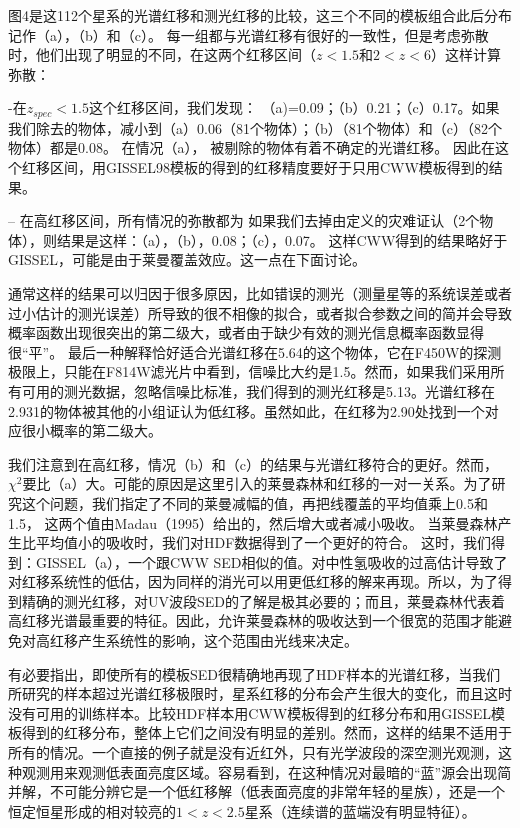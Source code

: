 \documentclass[8pt,a4paper,openany,twoside]{book}
\begin{document}
 
 
 
图4是这112个星系的光谱红移和测光红移的比较，这三个不同的模板组合此后分布记作（a），（b）和（c）。
每一组都与光谱红移有很好的一致性，但是考虑弥散时，他们出现了明显的不同，在这两个红移区间（$z<1.5和2<z<6$）这样计算弥散：
 
-在$z_{spec}< 1.5$这个红移区间，我们发现：
（a)=0.09；（b）0.21；（c）0.17。如果我们除去的物体，减小到（a）0.06（81个物体）；（b）（81个物体）和（c）（82个物体）都是0.08。
在情况（a）， 被剔除的物体有着不确定的光谱红移。
因此在这个红移区间，用GISSEL98模板的得到的红移精度要好于只用CWW模板得到的结果。
 
-- 在高红移区间，所有情况的弥散都为
如果我们去掉由定义的灾难证认（2个物体），则结果是这样：（a），（b），0.08；（c），0.07。
这样CWW得到的结果略好于GISSEL，可能是由于莱曼覆盖效应。这一点在下面讨论。
 
通常这样的结果可以归因于很多原因，比如错误的测光（测量星等的系统误差或者过小估计的测光误差）所导致的很不相像的拟合，或者拟合参数之间的简并会导致概率函数出现很突出的第二级大，或者由于缺少有效的测光信息概率函数显得很“平”。
最后一种解释恰好适合光谱红移在5.64的这个物体，它在F450W的探测极限上，只能在F814W滤光片中看到，信噪比大约是1.5。然而，如果我们采用所有可用的测光数据，忽略信噪比标准，我们得到的测光红移是5.13。光谱红移在2.931的物体被其他的小组证认为低红移。虽然如此，在红移为2.90处找到一个对应很小概率的第二级大。
 
我们注意到在高红移，情况（b）和（c）的结果与光谱红移符合的更好。然而，$ \chi^2$要比（a）大。可能的原因是这里引入的莱曼森林和红移的一对一关系。为了研究这个问题，我们指定了不同的莱曼减幅的值，再把线覆盖的平均值乘上0.5和1.5，
这两个值由Madau（1995）给出的，然后增大或者减小吸收。
当莱曼森林产生比平均值小的吸收时，我们对HDF数据得到了一个更好的符合。
这时，我们得到：GISSEL（a），一个跟CWW SED相似的值。对中性氢吸收的过高估计导致了对红移系统性的低估，因为同样的消光可以用更低红移的解来再现。所以，为了得到精确的测光红移，对UV波段SED的了解是极其必要的；而且，莱曼森林代表着高红移光谱最重要的特征。因此，允许莱曼森林的吸收达到一个很宽的范围才能避免对高红移产生系统性的影响，这个范围由光线来决定。
 
有必要指出，即使所有的模板SED很精确地再现了HDF样本的光谱红移，当我们所研究的样本超过光谱红移极限时，星系红移的分布会产生很大的变化，而且这时没有可用的训练样本。比较HDF样本用CWW模板得到的红移分布和用GISSEL模板得到的红移分布，整体上它们之间没有明显的差别。然而，这样的结果不适用于所有的情况。一个直接的例子就是没有近红外，只有光学波段的深空测光观测，这种观测用来观测低表面亮度区域。容易看到，在这种情况对最暗的“蓝”源会出现简并解，不可能分辨它是一个低红移解（低表面亮度的非常年轻的星族），还是一个恒定恒星形成的相对较亮的$1<z< 2.5$星系（连续谱的蓝端没有明显特征）。
 
\end{document}
